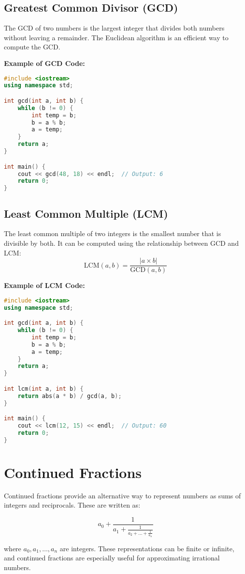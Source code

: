 \documentclass[10pt,a4paper]{article}
\begin{document}
\subsection*{Greatest Common Divisor (GCD)}
The GCD of two numbers is the largest integer that divides both numbers without leaving a remainder. The Euclidean algorithm is an efficient way to compute the GCD.

\textbf{Example of GCD Code:}
\begin{lstlisting}[language=C++]
#include <iostream>
using namespace std;

int gcd(int a, int b) {
    while (b != 0) {
        int temp = b;
        b = a % b;
        a = temp;
    }
    return a;
}

int main() {
    cout << gcd(48, 18) << endl;  // Output: 6
    return 0;
}
\end{lstlisting}

\subsection*{Least Common Multiple (LCM)}
The least common multiple of two integers is the smallest number that is divisible by both. It can be computed using the relationship between GCD and LCM:
\[
\text{LCM}(a, b) = \frac{|a \times b|}{\text{GCD}(a, b)}
\]

\textbf{Example of LCM Code:}
\begin{lstlisting}[language=C++]
#include <iostream>
using namespace std;

int gcd(int a, int b) {
    while (b != 0) {
        int temp = b;
        b = a % b;
        a = temp;
    }
    return a;
}

int lcm(int a, int b) {
    return abs(a * b) / gcd(a, b);
}

int main() {
    cout << lcm(12, 15) << endl;  // Output: 60
    return 0;
}
\end{lstlisting}


\section*{Continued Fractions}

Continued fractions provide an alternative way to represent numbers as sums of integers and reciprocals. These are written as:

\[
a_0 + \frac{1}{a_1 + \frac{1}{a_2 + \dots + \frac{1}{a_n}}}
\]

where \(a_0, a_1, \dots, a_n\) are integers. These representations can be finite or infinite, and continued fractions are especially useful for approximating irrational numbers.
\end{document}
